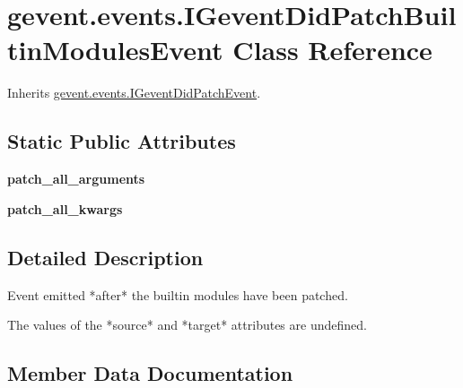 \hypertarget{classgevent_1_1events_1_1_i_gevent_did_patch_builtin_modules_event}{}\section{gevent.\+events.\+I\+Gevent\+Did\+Patch\+Builtin\+Modules\+Event Class Reference}
\label{classgevent_1_1events_1_1_i_gevent_did_patch_builtin_modules_event}


Inherits \hyperlink{classgevent_1_1events_1_1_i_gevent_did_patch_event}{gevent.\+events.\+I\+Gevent\+Did\+Patch\+Event}.

\subsection*{Static Public Attributes}
\begin{DoxyCompactItemize}
\item 
{\bfseries patch\+\_\+all\+\_\+arguments}
\item 
{\bfseries patch\+\_\+all\+\_\+kwargs}
\end{DoxyCompactItemize}


\subsection{Detailed Description}
\begin{DoxyVerb}Event emitted *after* the builtin modules have been patched.

The values of the *source* and *target* attributes are undefined.
\end{DoxyVerb}
 

\subsection{Member Data Documentation}
\mbox{\label{classgevent_1_1events_1_1_i_gevent_did_patch_builtin_modules_event_a0e4b7520b0f0008c57e0a4dd1301d99e}} 
